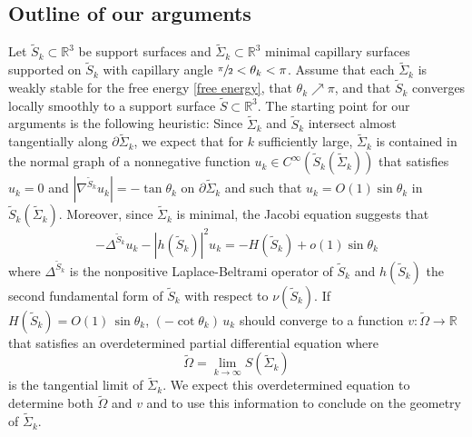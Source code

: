 \documentclass[11pt]{amsart}
\begin{document}
\subsection*{Outline of our arguments}
	Let $\tilde S_k\subset \mathbb{R}^3$ be support surfaces and $\tilde \Sigma_k\subset \mathbb{R}^3$  minimal capillary surfaces supported on $\tilde S_k$ with capillary angle $\sfrac{\pi}2<\theta_k<\pi$. Assume that each $\tilde \Sigma_k$ is weakly stable for the free energy \eqref{free energy}, that $\theta_k\nearrow \pi$, and that $\tilde S_k$ converges locally smoothly to a support surface $\tilde S\subset \mathbb{R}^3$. The starting point for our arguments is the following heuristic: Since $\tilde \Sigma_k$  and $\tilde S_k$ intersect almost tangentially along $\partial \tilde \Sigma_k$, we expect that for $k$ sufficiently large, $\tilde \Sigma_k$ is contained in the normal graph of a nonnegative function $ u_k\in C^\infty(\tilde S_k(\tilde \Sigma_k))$ that satisfies  $u_k=0$  and $|\nabla^{\tilde S_k}u_k|=-\tan\theta_k$ on $\partial \tilde \Sigma_k$ and such that  $u_k=O(1)\sin\theta_k$ in $\tilde S_k(\tilde \Sigma_k)$. Moreover, since $\tilde \Sigma_k$ is minimal, the Jacobi equation suggests that   
	$$
	-\Delta^{\tilde S_k} u_k-|h(\tilde S_k)|^2u_k=-H(\tilde S_k)+o(1)\sin\theta_k 
	$$
	where $\Delta^{\tilde S_k}$ is the nonpositive Laplace-Beltrami operator of $\tilde S_k$ and $h(\tilde S_k)$  the second fundamental form of $\tilde S_k$ with respect to $\nu(\tilde S_k)$. 
If $H(\tilde S_k)=O(1)\,\sin\theta_k$, $(-\cot \theta_k)\,u_k$ should converge to a function $v:\tilde \Omega\to \mathbb{R}$ that satisfies an overdetermined partial differential equation where 
$$
\tilde \Omega=\lim_{k\to\infty} S(\tilde \Sigma_k)
$$ is the tangential limit of $\tilde \Sigma_k$. We expect this overdetermined equation to determine both $\tilde \Omega$ and $v$ and to use this information to conclude on the geometry of $\tilde \Sigma_k$.
\end{document}
